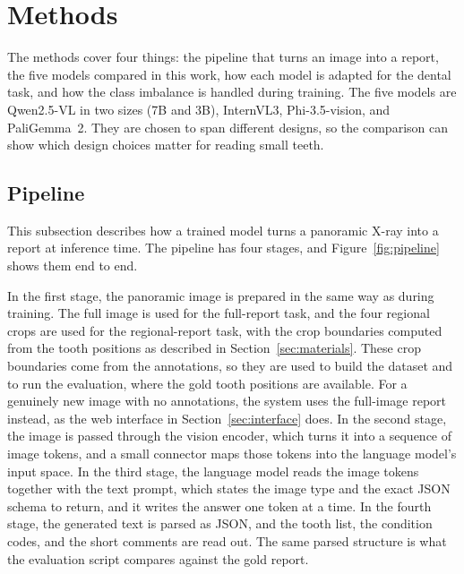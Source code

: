 \documentclass[a4paper,12pt]{report}
\begin{document}
\section{Methods}
\label{sec:methods}

The methods cover four things: the pipeline that turns an image into a report, the five models compared in this work, how each model is adapted for the dental task, and how the class imbalance is handled during training. The five models are Qwen2.5-VL in two sizes (7B and 3B), InternVL3, Phi-3.5-vision, and PaliGemma~2. They are chosen to span different designs, so the comparison can show which design choices matter for reading small teeth.

\subsection{Pipeline}
\label{sec:pipeline}

This subsection describes how a trained model turns a panoramic X-ray into a report at inference time. The pipeline has four stages, and Figure~\ref{fig:pipeline} shows them end to end.

In the first stage, the panoramic image is prepared in the same way as during training. The full image is used for the full-report task, and the four regional crops are used for the regional-report task, with the crop boundaries computed from the tooth positions as described in Section~\ref{sec:materials}. These crop boundaries come from the annotations, so they are used to build the dataset and to run the evaluation, where the gold tooth positions are available. For a genuinely new image with no annotations, the system uses the full-image report instead, as the web interface in Section~\ref{sec:interface} does. In the second stage, the image is passed through the vision encoder, which turns it into a sequence of image tokens, and a small connector maps those tokens into the language model's input space. In the third stage, the language model reads the image tokens together with the text prompt, which states the image type and the exact JSON schema to return, and it writes the answer one token at a time. In the fourth stage, the generated text is parsed as JSON, and the tooth list, the condition codes, and the short comments are read out. The same parsed structure is what the evaluation script compares against the gold report.
\end{document}
